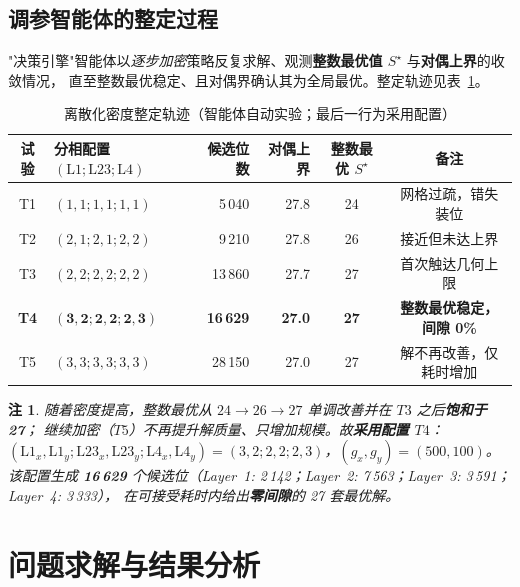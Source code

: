 \documentclass[11pt]{article}
\newtheorem{remark}{注}
\begin{document}
\subsection{调参智能体的整定过程}
"决策引擎"智能体以\emph{逐步加密}策略反复求解、观测\textbf{整数最优值 $S^\star$} 与\textbf{对偶上界}的收敛情况，
直至整数最优稳定、且对偶界确认其为全局最优。整定轨迹见表~\ref{tab:tuning}。

\begin{table}[ht]
\centering
\caption{离散化密度整定轨迹（智能体自动实验；最后一行为采用配置）}
\label{tab:tuning}
\small
\begin{tabular}{clrrcc}
\toprule
试验 & 分相配置 $(\text{L1};\text{L23};\text{L4})$ & 候选位数 & 对偶上界 & 整数最优 $S^\star$ & 备注 \\
\midrule
T1 & $(1,1;1,1;1,1)$ & 5\,040  & 27.8 & 24 & 网格过疏，错失装位 \\
T2 & $(2,1;2,1;2,2)$ & 9\,210  & 27.8 & 26 & 接近但未达上界 \\
T3 & $(2,2;2,2;2,2)$ & 13\,860 & 27.7 & 27 & 首次触达几何上限 \\
\textbf{T4} & $\mathbf{(3,2;2,2;2,3)}$ & \textbf{16\,629} & \textbf{27.0} & \textbf{27} & \textbf{整数最优稳定，间隙 0\%} \\
T5 & $(3,3;3,3;3,3)$ & 28\,150 & 27.0 & 27 & 解不再改善，仅耗时增加 \\
\bottomrule
\end{tabular}
\end{table}

\begin{remark}
随着密度提高，整数最优从 $24\!\to\!26\!\to\!27$ 单调改善并在 $T3$ 之后\textbf{饱和于 27}；
继续加密（$T5$）不再提升解质量、只增加规模。故\textbf{采用配置 $T4$}：
$(\text{L1}_x,\text{L1}_y;\text{L23}_x,\text{L23}_y;\text{L4}_x,\text{L4}_y)=(3,2;2,2;2,3)$，$(g_x,g_y)=(500,100)$。
该配置生成 \textbf{16\,629} 个候选位（Layer~1: 2\,142；Layer~2: 7\,563；Layer~3: 3\,591；Layer~4: 3\,333），
在可接受耗时内给出\textbf{零间隙}的 27 套最优解。
\end{remark}

\section{问题求解与结果分析}
\label{sec:solve}
\end{document}
